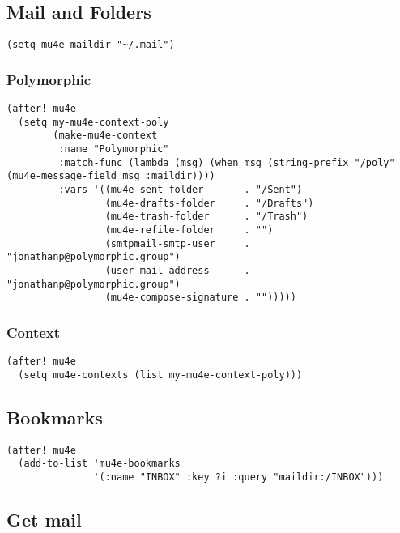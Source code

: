 \documentclass[11pt]{article}
\begin{document}
\subsection{Mail and Folders}
\label{sec:org34022c7}

\begin{verbatim}
(setq mu4e-maildir "~/.mail")
\end{verbatim}
\subsubsection{Polymorphic}
\label{sec:org56c4d8a}

\begin{verbatim}
(after! mu4e
  (setq my-mu4e-context-poly
        (make-mu4e-context
         :name "Polymorphic"
         :match-func (lambda (msg) (when msg (string-prefix "/poly" (mu4e-message-field msg :maildir))))
         :vars '((mu4e-sent-folder       . "/Sent")
                 (mu4e-drafts-folder     . "/Drafts")
                 (mu4e-trash-folder      . "/Trash")
                 (mu4e-refile-folder     . "")
                 (smtpmail-smtp-user     . "jonathanp@polymorphic.group")
                 (user-mail-address      . "jonathanp@polymorphic.group")
                 (mu4e-compose-signature . "")))))
\end{verbatim}
\subsubsection{Context}
\label{sec:orgcb86b14}

\begin{verbatim}
(after! mu4e
  (setq mu4e-contexts (list my-mu4e-context-poly)))
\end{verbatim}
\subsection{Bookmarks}
\label{sec:orgef75fa9}

\begin{verbatim}
(after! mu4e
  (add-to-list 'mu4e-bookmarks
               '(:name "INBOX" :key ?i :query "maildir:/INBOX")))
\end{verbatim}
\subsection{Get mail}
\label{sec:orgd4081c2}
\end{document}
